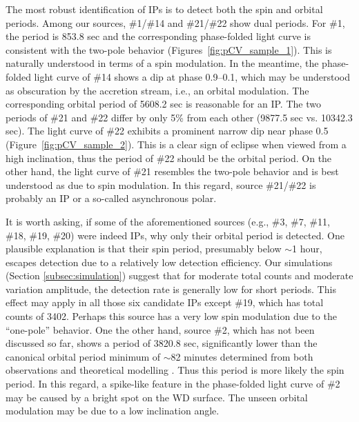 \documentclass[fleqn,usenatbib]{mnras}
\begin{document}
The most robust identification of IPs is to detect both the spin and orbital periods. Among our sources, \#1/\#14 and \#21/\#22 show dual periods.
For \#1, the period is 853.8 sec and the corresponding phase-folded light curve is consistent with the two-pole behavior (Figures~\ref{fig:pCV_sample_1}). This is naturally understood in terms of a spin modulation. 
In the meantime, the phase-folded light curve of \#14 shows a dip at phase 0.9--0.1, which may be understood as obscuration by the accretion stream, i.e., an orbital modulation. The corresponding orbital period of 5608.2 sec is reasonable for an IP. 
The two periods of \#21 and \#22 differ by only 5\% from each other (9877.5 sec vs. 10342.3 sec).
The light curve of \#22 exhibits a prominent narrow dip near phase 0.5 (Figure~\ref{fig:pCV_sample_2}). This is a clear sign of eclipse when viewed from a high inclination, thus the period of \#22 should be the orbital period. 
On the other hand, the light curve of \#21 resembles the two-pole behavior and is best understood as due to spin modulation. 
In this regard, source \#21/\#22 is probably an IP or a so-called asynchronous polar. 

It is worth asking, if some of the aforementioned sources (e.g., \#3, \#7, \#11, \#18, \#19, \#20) were indeed IPs, why only their orbital period is detected. One plausible explanation is that their spin period, presumably below $\sim$1 hour, escapes detection due to a relatively low detection efficiency. Our simulations (Section \ref{subsec:simulation}) suggest that for moderate total counts and moderate variation amplitude, the detection rate is generally low for short periods. This effect may apply in all those six candidate IPs except \#19, which has total counts of 3402. Perhaps this source has a very low spin modulation due to the ``one-pole'' behavior.
One the other hand, source \#2, which has not been discussed so far, shows a period of 3820.8 sec, significantly lower than the canonical orbital period minimum of $\sim$82 minutes determined from both observations \citep{2009MNRAS.397.2170G} and theoretical modelling \citep{2011ApJS..194...28K}. %
Thus this period is more likely the spin period.
In this regard, a spike-like feature in the phase-folded light curve of \#2 may be caused by a bright spot on the WD surface. 
The unseen orbital modulation may be due to a low inclination angle. 
\end{document}
